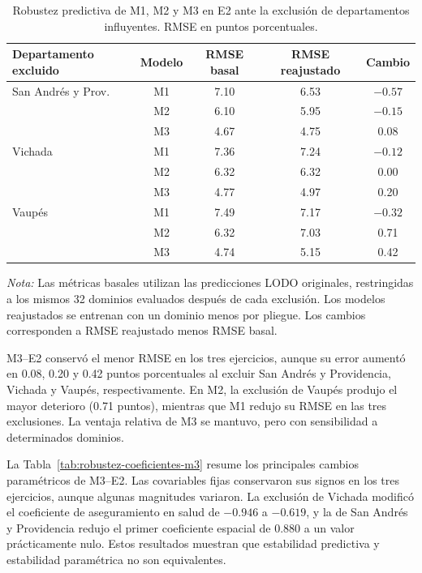 \begin{table}[!htbp]
\centering
\footnotesize
\caption{Robustez predictiva de M1, M2 y M3 en E2 ante la exclusión de departamentos influyentes. RMSE en puntos porcentuales.}
\label{tab:robustez-influencia-lodo}
\renewcommand{\arraystretch}{1.1}
\setlength{\tabcolsep}{5pt}
\begin{tabular}{l c c c c}
\hline
Departamento excluido & Modelo & RMSE basal & RMSE reajustado & Cambio \\
\hline
San Andrés y Prov. & M1 & 7.10 & 6.53 & $-0.57$ \\
                   & M2 & 6.10 & 5.95 & $-0.15$ \\
                   & M3 & 4.67 & 4.75 & 0.08 \\
\hline
Vichada            & M1 & 7.36 & 7.24 & $-0.12$ \\
                   & M2 & 6.32 & 6.32 & 0.00 \\
                   & M3 & 4.77 & 4.97 & 0.20 \\
\hline
Vaupés             & M1 & 7.49 & 7.17 & $-0.32$ \\
                   & M2 & 6.32 & 7.03 & 0.71 \\
                   & M3 & 4.74 & 5.15 & 0.42 \\
\hline
\end{tabular}

\vspace{2mm}
\parbox{0.95\linewidth}{\footnotesize
\textit{Nota:} Las métricas basales utilizan las predicciones LODO originales, restringidas a los mismos 32 dominios evaluados después de cada exclusión. Los modelos reajustados se entrenan con un dominio menos por pliegue. Los cambios corresponden a RMSE reajustado menos RMSE basal.}
\end{table}

M3--E2 conservó el menor RMSE en los tres ejercicios, aunque su error aumentó en 0.08, 0.20 y 0.42 puntos porcentuales al excluir San Andrés y Providencia, Vichada y Vaupés, respectivamente. En M2, la exclusión de Vaupés produjo el mayor deterioro (0.71 puntos), mientras que M1 redujo su RMSE en las tres exclusiones. La ventaja relativa de M3 se mantuvo, pero con sensibilidad a determinados dominios.

La Tabla~\ref{tab:robustez-coeficientes-m3} resume los principales cambios paramétricos de M3--E2. Las covariables fijas conservaron sus signos en los tres ejercicios, aunque algunas magnitudes variaron. La exclusión de Vichada modificó el coeficiente de aseguramiento en salud de $-0.946$ a $-0.619$, y la de San Andrés y Providencia redujo el primer coeficiente espacial de 0.880 a un valor prácticamente nulo. Estos resultados muestran que estabilidad predictiva y estabilidad paramétrica no son equivalentes.

